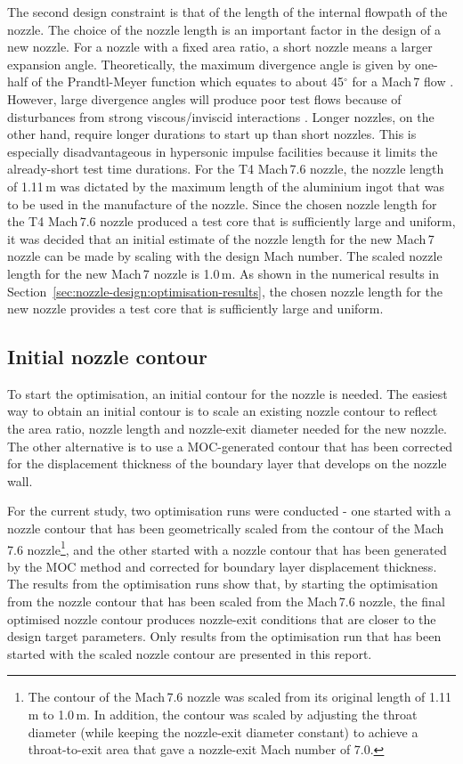 \documentclass[12pt,a4paper]{article}
\begin{document}
The second design constraint is that of the length of the internal flowpath 
of the nozzle. The choice of the nozzle length is an important factor in the 
design of a new nozzle. For a nozzle with a fixed area ratio, a short nozzle 
means a larger expansion angle. Theoretically, the maximum divergence angle 
is given by one-half of the Prandtl-Meyer function which equates to about 
45$^{\circ}$ for a Mach\,7 flow . However, large 
divergence angles will produce poor test flows because of disturbances from 
strong viscous/inviscid interactions . Longer nozzles,
on the other hand, require longer durations to start up than short nozzles. 
This is especially disadvantageous in hypersonic impulse facilities because 
it limits the already-short test time durations. For the T4 Mach\,7.6 nozzle, 
the nozzle length of 1.11\,m was dictated by the maximum length of the 
aluminium ingot that was to be used in the manufacture of the nozzle. Since 
the chosen nozzle length for the T4 Mach\,7.6 nozzle produced a test core 
that is sufficiently large and uniform, it was decided that an initial 
estimate of the nozzle length for the new Mach\,7 nozzle can be made by 
scaling with the design Mach number. The scaled nozzle length for the new 
Mach\,7 nozzle is 1.0\,m. As shown in the numerical results in 
Section~\ref{sec:nozzle-design:optimisation-results}, the chosen nozzle length 
for the new nozzle provides a test core that is sufficiently large and uniform.


\subsection{Initial nozzle contour}
\label{sec:nozzle-design:initial-contour}
%
To start the optimisation, an initial contour for the nozzle is needed. The 
easiest way to obtain an initial contour is to scale an existing nozzle 
contour to reflect the area ratio, nozzle length and nozzle-exit diameter 
needed for the new nozzle. The other alternative is to use a MOC-generated
contour that has been corrected for the displacement thickness of the 
boundary layer that develops on the nozzle wall.

For the current study, two optimisation runs were conducted - one started with
a nozzle contour that has been geometrically scaled from the contour of the 
Mach\,7.6 nozzle\footnote{The contour of the Mach\,7.6 nozzle was scaled from
its original length of 1.11\,m to 1.0\,m. In addition, the contour was scaled
by adjusting the throat diameter (while keeping the nozzle-exit diameter constant) 
to achieve a throat-to-exit area that gave a nozzle-exit Mach number of 7.0.}, 
and the other started with a nozzle contour that has been generated by the MOC 
method and corrected for boundary layer displacement thickness. The results from 
the optimisation runs show that, by starting the optimisation from the nozzle 
contour that has been scaled from the Mach\,7.6 nozzle, the final optimised 
nozzle contour produces nozzle-exit conditions that are closer to the design 
target parameters. Only results from the optimisation run that has been started 
with the scaled nozzle contour are presented in this report.
\end{document}
